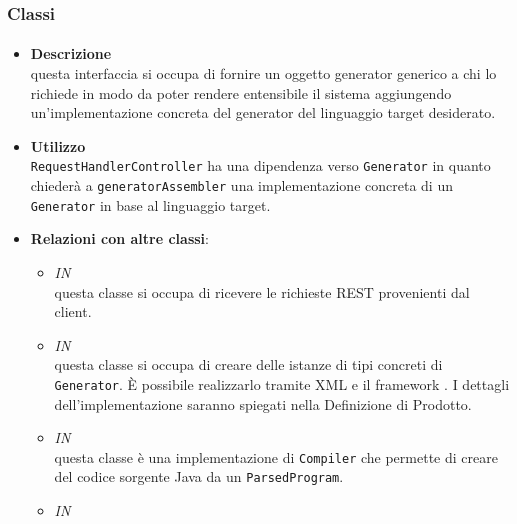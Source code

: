 \subsubsection{Classi}
\paragraph{}
\label{\nogloxy{SWEDesigner::Server::Generator::Generator}}
\begin{itemize}
\item \textbf{Descrizione}\\
questa interfaccia si occupa di fornire un oggetto generator generico a chi lo richiede in modo da poter rendere entensibile il sistema aggiungendo un'implementazione concreta del generator del linguaggio target desiderato.
\item \textbf{Utilizzo}\\
\texttt{RequestHandlerController} ha una dipendenza verso \texttt{Generator} in quanto chiederà a \texttt{generatorAssembler} una implementazione concreta di un \texttt{Generator} in base al linguaggio target.
\item \textbf{Relazioni con altre classi}:
\begin{itemize}
\item \textit{IN} \hyperref[\nogloxy{SWEDesigner::Server::Controller::RequestHandlerController}]{}\\
questa classe si occupa di ricevere le richieste REST provenienti dal client.
\item \textit{IN} \hyperref[\nogloxy{SWEDesigner::Server::Generator::GeneratorAssembler}]{}\\
questa classe si occupa di creare delle istanze di tipi concreti di \texttt{Generator}. È possibile realizzarlo tramite XML e il framework \spring. I dettagli dell'implementazione saranno spiegati nella Definizione di Prodotto. %
\item \textit{IN} \hyperref[\nogloxy{SWEDesigner::Server::Generator::Java::JavaGenerator}]{}\\
questa classe è una implementazione di \texttt{Compiler} che permette di creare del codice sorgente Java da un \texttt{ParsedProgram}.
\item \textit{IN} \hyperref[\nogloxy{SWEDesigner::Server::Template::TemplateAssembler}]{}\\

\end{itemize}
\end{itemize}
